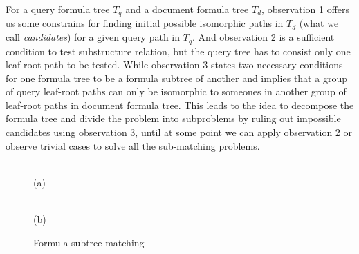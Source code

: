 \documentclass{acm_proc_article-sp}
\begin{document}
For a query formula tree $T_q$ and a document formula tree $T_d$, observation 1 offers us some constrains for finding initial possible isomorphic paths in $T_d$ (what we call \textit{candidates}) for a given query path in $T_q$.
And observation 2 is a sufficient condition to test substructure relation, but the query tree has to consist only one leaf-root path to be tested. 
While observation 3 states two necessary conditions for one formula tree to be a formula subtree of another and implies that a group of query leaf-root paths can only be isomorphic to someones in another group of leaf-root paths in document formula tree. 
This leads to the idea to decompose the formula tree and divide the problem into subproblems by ruling out impossible candidates using observation 3, until at some point we can apply observation 2 or observe trivial cases to solve all the sub-matching problems.

\begin{figure}
\begin{minipage}[b]{1.65in}
\begin{center}
\\(a)
\end{center}
\end{minipage}
\hspace*{0in}
\begin{minipage}[b]{1.65in}
\begin{center}
\\(b)
\end{center}
\end{minipage}
\caption{Formula subtree matching}\label{submatch}
\end{figure}
\end{document}
